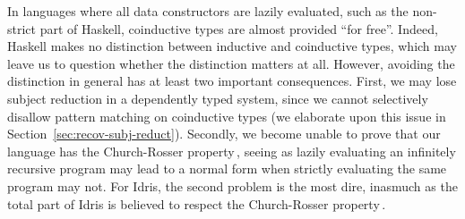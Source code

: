 In languages where all data constructors are lazily evaluated, such as the
non-strict part of Haskell, coinductive types are almost provided ``for
free''. Indeed, Haskell makes no distinction between inductive and coinductive
types, which may leave us to question whether the distinction matters at
all. However, avoiding the distinction in general has at least two important
consequences. First, we may lose subject reduction in a dependently typed
system, since we cannot selectively disallow pattern matching on coinductive
types (we elaborate upon this issue in
Section~\ref{sec:recov-subj-reduct}). Secondly, we become unable to prove that
our language has the Church-Rosser property\,\citep{CR:36}, seeing as lazily
evaluating an infinitely recursive program may lead to a normal form when strictly
evaluating the same program may not. For Idris, the second problem is the most
dire, inasmuch as the total part of Idris is believed to respect the Church-Rosser property\,\citep{BradyIdrisImpl13}.





